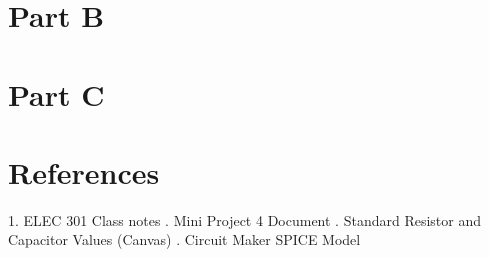 \documentclass[12pt]{article}
\begin{document}
\section{Part B}


\section{Part C}

\section{References}
1. ELEC 301 Class notes 
. Mini Project 4 Document
. Standard Resistor and Capacitor Values (Canvas)
. Circuit Maker SPICE Model
\end{document}

